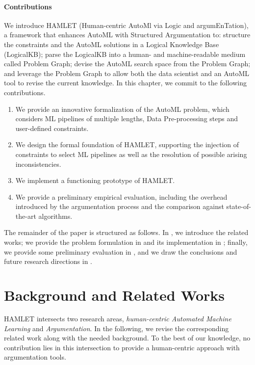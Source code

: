 \paragraph{Contributions}
We introduce HAMLET (Human-centric AutoMl via Logic and argumEnTation), a framework that enhances AutoML with Structured Argumentation to:
structure the constraints and the AutoML solutions in a Logical Knowledge Base (LogicalKB);
parse the LogicalKB into a human- and machine-readable medium called Problem Graph;
devise the AutoML search space from the Problem Graph;
and leverage the Problem Graph to allow both the data scientist and an AutoML tool to revise the current knowledge.
In this chapter, we commit to the following contributions.
\begin{enumerate}
    \item We provide an innovative formalization of the AutoML problem, which considers ML pipelines of multiple lengths, Data Pre-processing steps and user-defined constraints.
    \item We design the formal foundation of HAMLET, supporting the injection of constraints to select ML pipelines as well as the resolution of possible arising inconsistencies.
    \item We implement a functioning prototype of HAMLET.
    \item We provide a preliminary empirical evaluation, including the overhead introduced by the argumentation process and the comparison against state-of-the-art algorithms.
\end{enumerate}

The remainder of the paper is structured as follows. In , we introduce the related works; we provide the problem formulation in  and its implementation in ; finally, we provide some preliminary evaluation in , and we draw the conclusions and future research directions in .

\section{Background and Related Works}\label{hamlet-sec:related}
HAMLET intersects two research areas, \emph{human-centric Automated Machine Learning} and \emph{Argumentation}.
In the following, we revise the corresponding related work along with the needed background.
To the best of our knowledge, no contribution lies in this intersection to provide a human-centric approach with argumentation tools.

